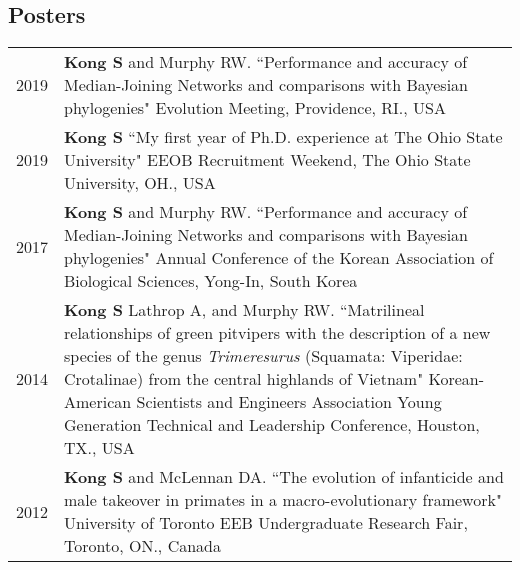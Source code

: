 \documentclass[11pt]{article}
\begin{document}
\subsection*{Posters}
\begin{longtable}{p{}  p{}}
2019 & \textbf{Kong S} and Murphy RW. ``Performance and accuracy of Median-Joining Networks and comparisons with Bayesian phylogenies" Evolution Meeting, Providence, RI., USA \vspace{5pt} \\ 
2019 &  \textbf{Kong S} ``My first year of Ph.D. experience at The Ohio State University" EEOB Recruitment Weekend,  The Ohio State University, OH., USA\vspace{5pt} \\ 
2017 & \textbf{Kong S} and Murphy RW. ``Performance and accuracy of Median-Joining Networks and comparisons with Bayesian phylogenies"  Annual Conference of the Korean Association of Biological Sciences, Yong-In, South Korea\vspace{5pt} \\ 
2014 & \textbf{Kong S} Lathrop A, and Murphy RW. ``Matrilineal relationships of green pitvipers with the description of a new species of the genus \textit{Trimeresurus} (Squamata: Viperidae: Crotalinae) from the central highlands of Vietnam" Korean-American Scientists and Engineers Association Young Generation Technical and Leadership Conference, Houston, TX., USA\vspace{5pt} \\ 
2012 & \textbf{Kong S} and McLennan DA. ``The evolution of infanticide and male takeover in primates in a macro-evolutionary framework" University of Toronto EEB Undergraduate Research Fair, Toronto, ON., Canada\vspace{5pt}\\
\end{longtable}
\end{document}
